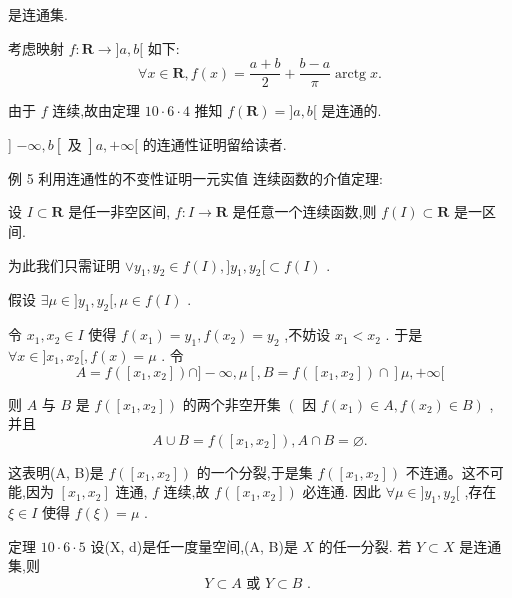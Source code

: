 是连通集.

考虑映射 $f : \mathbf{R} \rightarrow  \rbrack a,b\lbrack$ 如下:
$$\forall x \in  \mathbf{R},f\left( x\right)  = \frac{a + b}{2} + \frac{b - a}{\pi }\operatorname{arctg}x.$$

由于 $f$ 连续,故由定理 ${10} \cdot  6 \cdot  4$ 推知 $f\left( \mathbf{R}\right)  = \rbrack a,b\lbrack$ 是连通的.

] $- \infty ,b\left\lbrack  \text{ 及 }\right\rbrack  a, + \infty \lbrack$ 的连通性证明留给读者.

例 5 利用连通性的不变性证明一元实值 连续函数的介值定理:

设 $I \subset  \mathbf{R}$ 是任一非空区间, $f : I \rightarrow  \mathbf{R}$ 是任意一个连续函数,则 $f\left( I\right)  \subset  \mathbf{R}$ 是一区间.

为此我们只需证明 $\vee  {y}_{1},{y}_{2} \in  f\left( I\right) ,\rbrack {y}_{1},{y}_{2}\lbrack  \subset  f\left( I\right)$ .

假设 $\exists \mu  \in  \rbrack {y}_{1},{y}_{2}\lbrack ,\mu  \in  f\left( I\right)$ .

令 ${x}_{1},{x}_{2} \in  I$ 使得 $f\left( {x}_{1}\right)  = {y}_{1},f\left( {x}_{2}\right)  = {y}_{2}$ ,不妨设 ${x}_{1} < {x}_{2}$ . 于是 $\forall x \in  \rbrack {x}_{1},{x}_{2}\lbrack ,f\left( x\right)  = \mu$ . 令
$$A = f\left( \left\lbrack  {{x}_{1},{x}_{2}}\right\rbrack  \right)  \cap  \rbrack  - \infty ,\mu \left\lbrack  {,B = f\left( \left\lbrack  {{x}_{1},{x}_{2}}\right\rbrack  \right)  \cap  }\right\rbrack  \mu , + \infty \lbrack$$

则 $A$ 与 $B$ 是 $f\left( \left\lbrack  {{x}_{1},{x}_{2}}\right\rbrack  \right)$ 的两个非空开集 $\left( {\text{ 因 }f\left( {x}_{1}\right)  \in  A,f\left( {x}_{2}\right)  \in  B}\right)$ , 并且
$$A \cup  B = f\left( \left\lbrack  {{x}_{1},{x}_{2}}\right\rbrack  \right) ,A \cap  B = \varnothing .$$

这表明(A, B)是 $f\left( \left\lbrack  {{x}_{1},{x}_{2}}\right\rbrack  \right)$ 的一个分裂,于是集 $f\left( \left\lbrack  {{x}_{1},{x}_{2}}\right\rbrack  \right)$ 不连通。这不可能,因为 $\left\lbrack  {{x}_{1},{x}_{2}}\right\rbrack$ 连通, $f$ 连续,故 $f\left( \left\lbrack  {{x}_{1},{x}_{2}}\right\rbrack  \right)$ 必连通. 因此 $\forall \mu  \in  \rbrack {y}_{1},{y}_{2}\lbrack$ ,存在 $\xi  \in  I$ 使得 $f\left( \xi \right)  = \mu$ .

定理 ${10} \cdot  6 \cdot  5$ 设(X, d)是任一度量空间,(A, B)是 $X$ 的任一分裂. 若 $Y \subset  X$ 是连通集,则
$$Y \subset  A\text{ 或 }Y \subset  B\text{ . }$$


